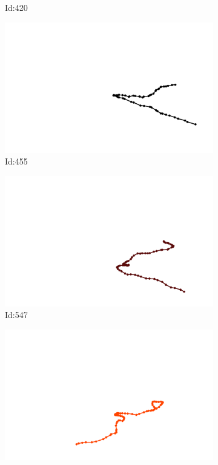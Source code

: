 \documentclass[12pt,twoside]{report}
\begin{document}
\begin{figure}
\begin{subfigure}[b]{0.20\textwidth}
\caption{Id:420}
\end{subfigure}
\begin{subfigure}[b]{0.20\textwidth}
\centering
\includegraphics[width=\textwidth]{../trajectories/455.png}
\caption{Id:455}
\end{subfigure}
\begin{subfigure}[b]{0.20\textwidth}
\centering
\includegraphics[width=\textwidth]{../trajectories/547.png}
\caption{Id:547}
\end{subfigure}
\begin{subfigure}[b]{0.20\textwidth}
\centering
\includegraphics[width=\textwidth]{../trajectories/569.png}

\end{subfigure}
\end{figure}
\end{document}
